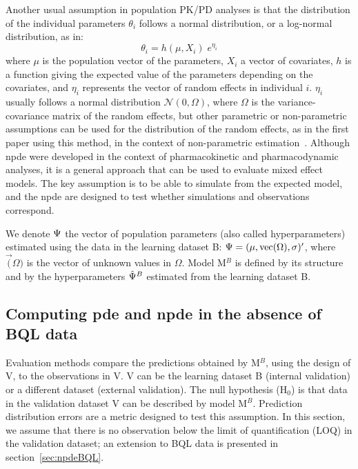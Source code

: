 Another usual assumption in population PK/PD analyses is that the distribution of the individual parameters 
$\theta_i$ follows a normal distribution, or a log-normal distribution, as in: 
\begin{equation} 
\theta_i=h(\mu,  X_i) \; e^{\eta_i} \label{eq:modelPKcov} 
\end{equation} 
where $\mu$ is the population vector of the parameters, 
$X_i$ a vector of covariates, $h$ is a function giving the expected value of the parameters depending on the 
covariates, and $\eta_i$ represents the vector of random effects in individual $i$. $\eta_i$ usually follows a 
normal distribution $\mathcal{N} (0, \Omega)$, where $\Omega$ is the variance-covariance matrix of the random 
effects, but other parametric or non-parametric assumptions can be used for the distribution of the random effects, 
as in the first paper using this method, in the context of non-parametric estimation~\cite{Mesnil}. Although npde 
were developed in the context of pharmacokinetic and pharmacodynamic analyses, it is a general approach that can be 
used to evaluate mixed effect models. The key assumption is to be able to simulate from the expected model, and the 
npde are designed to test whether simulations and observations correspond.

We denote ${\rm \Psi}$ the vector of population parameters (also called hyperparameters) estimated using the data 
in the learning dataset B: ${\rm \Psi}= (\mu, \vec(\Omega),\sigma)'$, where $\vec(\Omega)$ is the vector of unknown 
values in $\Omega$. Model M$^B$ is defined by its structure and by the hyperparameters $\hat{\rm \Psi}^B$ estimated 
from the learning dataset B.

\subsection{Computing pde and npde in the absence of BQL data} \label{subsec:npdenoBQL}

\hskip 18pt Evaluation methods compare the predictions obtained by M$^B$, using the design of V, to the 
observations in V. V can be the learning dataset B (internal validation) or a different dataset (external 
validation). The null hypothesis (H$_0$) is that data in the validation dataset V can be described by model M$^B$. 
Prediction distribution errors are a metric designed to test this assumption. In this section, we assume that there 
is no observation below the limit of quantification (LOQ) in the validation dataset; an extension to BQL data is 
presented in section~\ref{sec:npdeBQL}.

